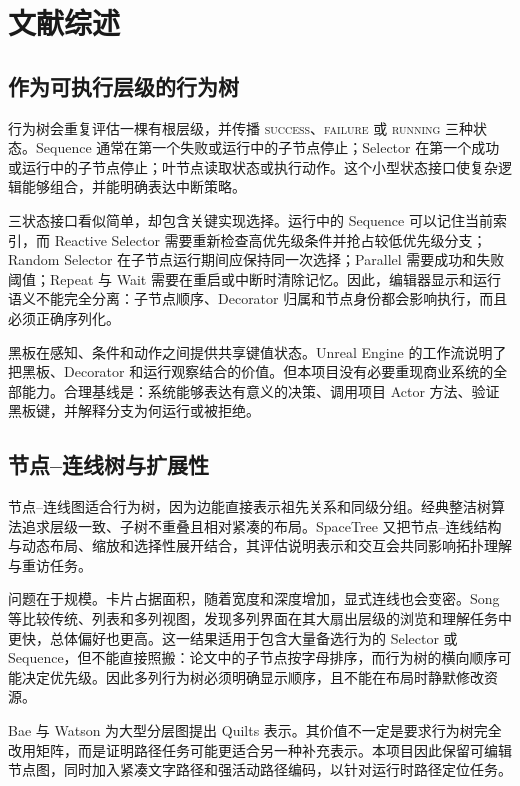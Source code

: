 \chapter{文献综述}
\label{ch:literature}

\section{作为可执行层级的行为树}

行为树会重复评估一棵有根层级，并传播 \textsc{success}、\textsc{failure} 或 \textsc{running} 三种状态。Sequence 通常在第一个失败或运行中的子节点停止；Selector 在第一个成功或运行中的子节点停止；叶节点读取状态或执行动作。这个小型状态接口使复杂逻辑能够组合，并能明确表达中断策略\parencite{colledanchise2018bt}。

三状态接口看似简单，却包含关键实现选择。运行中的 Sequence 可以记住当前索引，而 Reactive Selector 需要重新检查高优先级条件并抢占较低优先级分支；Random Selector 在子节点运行期间应保持同一次选择；Parallel 需要成功和失败阈值；Repeat 与 Wait 需要在重启或中断时清除记忆。因此，编辑器显示和运行语义不能完全分离：子节点顺序、Decorator 归属和节点身份都会影响执行，而且必须正确序列化。

黑板在感知、条件和动作之间提供共享键值状态。Unreal Engine 的工作流说明了把黑板、Decorator 和运行观察结合的价值\parencite{unrealbt}。但本项目没有必要重现商业系统的全部能力。合理基线是：系统能够表达有意义的决策、调用项目 Actor 方法、验证黑板键，并解释分支为何运行或被拒绝。

\section{节点--连线树与扩展性}

节点--连线图适合行为树，因为边能直接表示祖先关系和同级分组。经典整洁树算法追求层级一致、子树不重叠且相对紧凑的布局\parencite{reingold1981tidier}。SpaceTree 又把节点--连线结构与动态布局、缩放和选择性展开结合，其评估说明表示和交互会共同影响拓扑理解与重访任务\parencite{plaisant2002spacetree}。

问题在于规模。卡片占据面积，随着宽度和深度增加，显式连线也会变密。Song 等比较传统、列表和多列视图，发现多列界面在其大扇出层级的浏览和理解任务中更快，总体偏好也更高\parencite{song2010largefanout}。这一结果适用于包含大量备选行为的 Selector 或 Sequence，但不能直接照搬：论文中的子节点按字母排序，而行为树的横向顺序可能决定优先级。因此多列行为树必须明确显示顺序，且不能在布局时静默修改资源。

Bae 与 Watson 为大型分层图提出 Quilts 表示\parencite{bae2011quilts}。其价值不一定是要求行为树完全改用矩阵，而是证明路径任务可能更适合另一种补充表示。本项目因此保留可编辑节点图，同时加入紧凑文字路径和强活动路径编码，以针对运行时路径定位任务。

